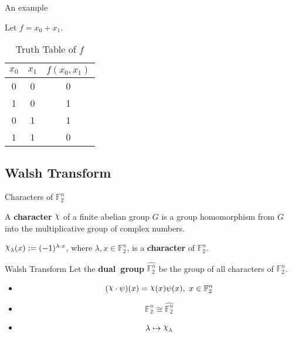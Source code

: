 \documentclass{beamer}
\def\gftwo{\mathbb{F}_2}
\def\Chi{\raisebox{2pt}{$\chi$}}
\begin{document}
\begin{frame}{An example}
  \begin{example}
    Let $f=x_0+x_1$.
    \begin{table}
    \label{tab:truth-table}
    	\centering
      \begin{tabular}{|c|c||c|}
        \hline
        $x_0$&$x_1$&$f(x_0,x_1)$\\
        \hline
        0&0&0\\
        1&0&1\\
        0&1&1\\
        1&1&0\\
      	\hline
    	\end{tabular}
    	\caption{Truth Table of $f$}
    \end{table}
  \end{example}
\end{frame}

\subsection{Walsh Transform}
\begin{frame}{Characters of $\gftwo^n$}
\begin{definition}
  A {\bf character} $\Chi$ of a finite abelian group $G$ is a group
  homomorphism from $G$ into the multiplicative group of complex numbers.
\end{definition}
  \begin{fact}
    $\Chi_\lambda(x):=(-1)^{\lambda\cdot x}$, where $\lambda,x\in\gftwo^n$,
    is a {\bf character} of $\gftwo^n$.
  \end{fact}
\end{frame}
\begin{frame}{Walsh Transform}
  Let the {\bf dual\ group} $\hat{\gftwo^n}$ be the group of all
  characters of $\gftwo^n$.
  \begin{itemize}
    \item[] \[ (\Chi\cdot\psi)(x)=\Chi(x)\psi(x),\ x\in\gftwo^n  \]
    \item[] \[\gftwo^n\cong\hat{\gftwo^n}\]
    \item[] \[\lambda\mapsto\Chi_\lambda\]
  \end{itemize}
\end{frame}
\end{document}
